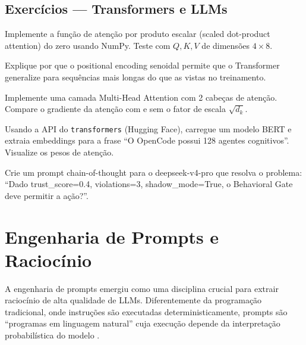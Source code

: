 \subsection{Exercícios — Transformers e LLMs}
\begin{exercicio}
Implemente a função de atenção por produto escalar (scaled dot-product
attention) do zero usando NumPy. Teste com $Q, K, V$ de dimensões
$4 \times 8$.
\end{exercicio}
\begin{exercicio}
Explique por que o positional encoding senoidal permite que o Transformer
generalize para sequências mais longas do que as vistas no treinamento.
\end{exercicio}
\begin{exercicio}
Implemente uma camada Multi-Head Attention com 2 cabeças de atenção.
Compare o gradiente da atenção com e sem o fator de escala $\sqrt{d_k}$.
\end{exercicio}
\begin{exercicio}
Usando a API do \texttt{transformers} (Hugging Face), carregue um modelo
BERT e extraia embeddings para a frase ``O OpenCode possui 128 agentes
cognitivos''. Visualize os pesos de atenção.
\end{exercicio}
\begin{exercicio}
Crie um prompt chain-of-thought para o deepseek-v4-pro que resolva o
problema: ``Dado trust\_score=0.4, violations=3, shadow\_mode=True, o
Behavioral Gate deve permitir a ação?''.
\end{exercicio}
\section{Engenharia de Prompts e Raciocínio}
\label{sec:engenharia-prompts}
\nivelavancado
A engenharia de prompts emergiu como uma disciplina crucial para extrair
raciocínio de alta qualidade de LLMs. Diferentemente da programação
tradicional, onde instruções são executadas deterministicamente, prompts
são ``programas em linguagem natural'' cuja execução depende da
interpretação probabilística do modelo \cite{white2023prompt}.
